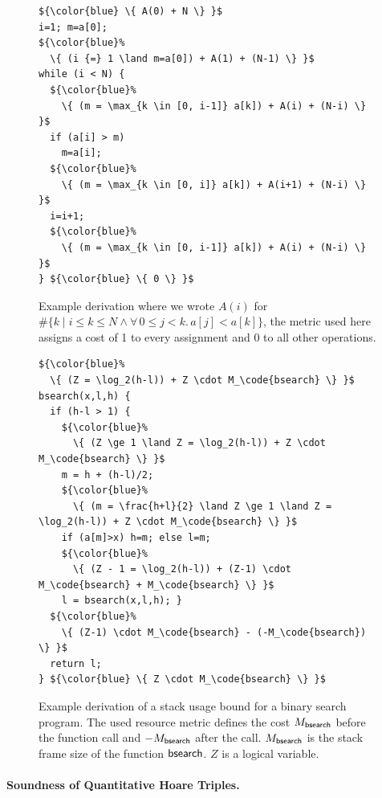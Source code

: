 \documentclass{sigplanconf}
\begin{document}
{\begin{figure}
\begin{lstlisting}
${\color{blue} \{ A(0) + N \} }$
i=1; m=a[0];
${\color{blue}%
  \{ (i {=} 1 \land m=a[0]) + A(1) + (N-1) \} }$
while (i < N) {
  ${\color{blue}%
    \{ (m = \max_{k \in [0, i-1]} a[k]) + A(i) + (N-i) \} }$
  if (a[i] > m)
    m=a[i];
  ${\color{blue}%
    \{ (m = \max_{k \in [0, i]} a[k]) + A(i+1) + (N-i) \} }$
  i=i+1;
  ${\color{blue}%
    \{ (m = \max_{k \in [0, i-1]} a[k]) + A(i) + (N-i) \} }$
} ${\color{blue} \{ 0 \} }$
\end{lstlisting}
\caption{Example derivation where we wrote $A(i)$
  for $\#\{ k \mid i \le k \le N \land \forall\, 0\le j<k.\, a[j] < a[k]\}$,
  the metric used here assigns a cost of 1 to every assignment
  and 0 to all other operations.
  }
\label{fig:xmplmax}
\end{figure}

\begin{figure}
\begin{lstlisting}
${\color{blue}%
  \{ (Z = \log_2(h-l)) + Z \cdot M_\code{bsearch} \} }$
bsearch(x,l,h) {
  if (h-l > 1) {
    ${\color{blue}%
      \{ (Z \ge 1 \land Z = \log_2(h-l)) + Z \cdot M_\code{bsearch} \} }$
    m = h + (h-l)/2;
    ${\color{blue}%
      \{ (m = \frac{h+l}{2} \land Z \ge 1 \land Z = \log_2(h-l)) + Z \cdot M_\code{bsearch} \} }$
    if (a[m]>x) h=m; else l=m;
    ${\color{blue}%
      \{ (Z - 1 = \log_2(h-l)) + (Z-1) \cdot M_\code{bsearch} + M_\code{bsearch} \} }$
    l = bsearch(x,l,h); }
  ${\color{blue}%
    \{ (Z-1) \cdot M_\code{bsearch} - (-M_\code{bsearch}) \} }$
  return l;
} ${\color{blue} \{ Z \cdot M_\code{bsearch} \} }$
\end{lstlisting}
\caption{Example derivation of a stack usage bound for a binary
  search program.  The used resource metric defines the cost $M_{\mathsf{bsearch}}$ before
  the function call and $-M_{\mathsf{bsearch}}$ after the call.  $M_{\mathsf{bsearch}}$ is the stack
  frame size of the function $\mathsf{bsearch}$.  $Z$ is a
  logical variable.
  }
\label{fig:xmplbs}
\end{figure}


\paragraph{Soundness of Quantitative Hoare Triples.}

}
\end{document}
